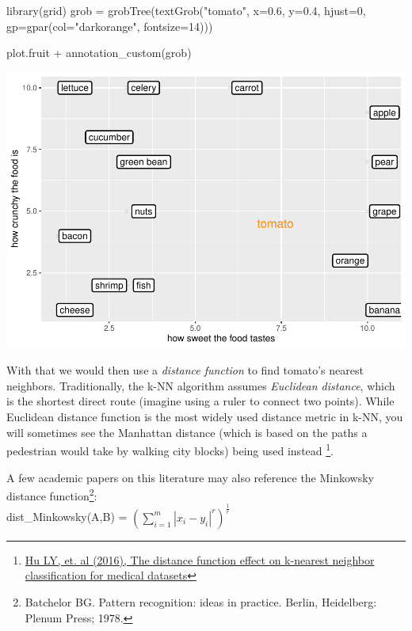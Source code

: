 \documentclass[
]{article}
\newenvironment{Shaded}{\begin{snugshade}}{\end{snugshade}}
\newcommand{\AttributeTok}[1]{\textcolor[rgb]{0.77,0.63,0.00}{#1}}
\newcommand{\DecValTok}[1]{\textcolor[rgb]{0.00,0.00,0.81}{#1}}
\newcommand{\FloatTok}[1]{\textcolor[rgb]{0.00,0.00,0.81}{#1}}
\newcommand{\FunctionTok}[1]{\textcolor[rgb]{0.00,0.00,0.00}{#1}}
\newcommand{\NormalTok}[1]{#1}
\newcommand{\OtherTok}[1]{\textcolor[rgb]{0.56,0.35,0.01}{#1}}
\newcommand{\SpecialCharTok}[1]{\textcolor[rgb]{0.00,0.00,0.00}{#1}}
\newcommand{\StringTok}[1]{\textcolor[rgb]{0.31,0.60,0.02}{#1}}
\begin{document}
\begin{Shaded}
\begin{Highlighting}[]
\FunctionTok{library}\NormalTok{(grid)}
\NormalTok{grob }\OtherTok{=} \FunctionTok{grobTree}\NormalTok{(}\FunctionTok{textGrob}\NormalTok{(}\StringTok{"tomato"}\NormalTok{, }\AttributeTok{x=}\FloatTok{0.6}\NormalTok{, }\AttributeTok{y=}\FloatTok{0.4}\NormalTok{, }\AttributeTok{hjust=}\DecValTok{0}\NormalTok{, }\AttributeTok{gp=}\FunctionTok{gpar}\NormalTok{(}\AttributeTok{col=}\StringTok{"darkorange"}\NormalTok{, }\AttributeTok{fontsize=}\DecValTok{14}\NormalTok{)))}

\NormalTok{plot.fruit }\SpecialCharTok{+} \FunctionTok{annotation\_custom}\NormalTok{(grob)}
\end{Highlighting}
\end{Shaded}

\includegraphics{classification1_files/figure-latex/unnamed-chunk-57-1.pdf}

With that we would then use a \emph{distance function} to find tomato's
nearest neighbors. Traditionally, the k-NN algorithm assumes
\emph{Euclidean distance}, which is the shortest direct route (imagine
using a ruler to connect two points). While Euclidean distance function
is the most widely used distance metric in k-NN, you will sometimes see
the Manhattan distance (which is based on the paths a pedestrian would
take by walking city blocks) being used instead \footnote{\href{https://www.ncbi.nlm.nih.gov/pmc/articles/PMC4978658/}{Hu
  LY, et. al (2016), The distance function effect on k-nearest neighbor
  classification for medical datasets}}.

A few academic papers on this literature may also reference the
Minkowsky distance function\footnote{Batchelor BG. Pattern recognition:
  ideas in practice. Berlin, Heidelberg: Plenum Press; 1978.}:\\
dist\_Minkowsky(A,B) =
\((\sum\limits^m_{i=1} |x_i -y_i|^r)^{\frac{1}{r}}\)
\end{document}
